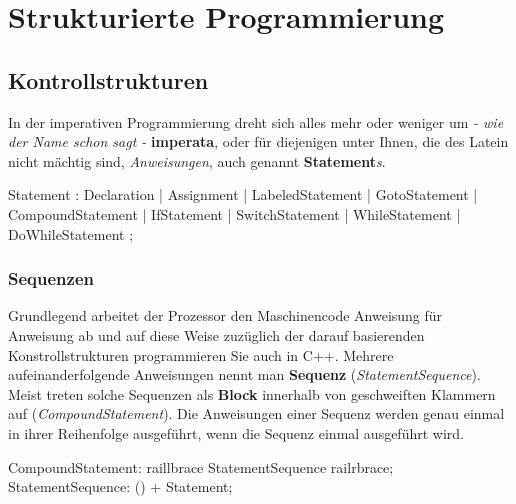 \documentclass[a4paper]{report}
\begin{document}

\chapter{Strukturierte Programmierung}
\section{Kontrollstrukturen}

In der imperativen Programmierung dreht sich alles mehr oder weniger um \textit{- wie der Name schon sagt -} \textbf{imperata}, oder für diejenigen unter Ihnen, die des Latein nicht mächtig sind, \textit{Anweisungen}, auch genannt \textbf{Statement}\textit{s}.

\begin{rail}
	Statement : Declaration |%
				Assignment |
				LabeledStatement |
				GotoStatement |
				CompoundStatement |
				IfStatement |
				SwitchStatement |
				WhileStatement |
				DoWhileStatement
				;
				
\end{rail}

\subsection{Sequenzen}
Grundlegend arbeitet der Prozessor den Maschinencode Anweisung für Anweisung ab und auf diese Weise zuzüglich der darauf basierenden Konstrollstrukturen programmieren Sie auch in C++. Mehrere aufeinanderfolgende Anweisungen nennt man \textbf{Sequenz} (\textit{StatementSequence}). Meist treten solche Sequenzen als \textbf{Block} innerhalb von geschweiften Klammern auf (\textit{CompoundStatement}). Die Anweisungen einer Sequenz werden genau einmal in ihrer Reihenfolge ausgeführt, wenn die Sequenz einmal ausgeführt wird.
\begin{rail}
	CompoundStatement: raillbrace StatementSequence railrbrace;
	StatementSequence:	() + Statement;	
\end{rail}
\end{document}
